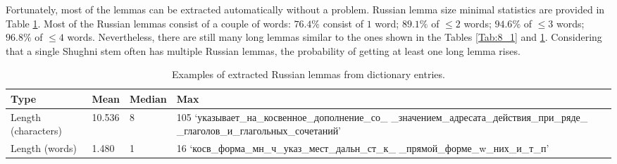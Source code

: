 Fortunately, most of the lemmas can be extracted automatically without a problem. Russian lemma size minimal statistics are provided in Table \ref{Tab:8_2}. Most of the Russian lemmas consist of a couple of words: $76.4\%$ consist of $1$ word; $89.1\%$ of $\leq 2$ words; $94.6\%$ of $\leq 3$ words; $96.8\%$ of $\leq 4$ words. Nevertheless, there are still many long lemmas similar to the ones shown in the Tables \ref{Tab:8_1} and \ref{Tab:8_2}. Considering that a single Shughni stem often has multiple Russian lemmas, the probability of getting at least one long lemma rises.

\begin{table}[!htbp]
    \begin{center}
        \begin{tabular}{|p{3cm}|p{1.5cm}|p{1.5cm}|p{8.5cm}|}
            \hline
            \textbf{Type} & \textbf{Mean} & \textbf{Median} & \textbf{Max} \\
            \hline
            \hline
            Length (characters) & 10.536 & 8 & 105 `указывает\_на\_косвенное\_дополнение\_со\_ \_значением\_адресата\_действия\_при\_ряде\_ \_глаголов\_и\_глагольных\_сочетаний' \\
            \hline
            Length (words) & 1.480 & 1 & 16 `косв\_форма\_мн\_ч\_указ\_мест\_дальн\_ст\_к\_ \_прямой\_форме\_w\_них\_и\_т\_п' \\
            \hline
        \end{tabular}
        \caption{Examples of extracted Russian lemmas from dictionary entries.}
        \label{Tab:8_2}
    \end{center}
\end{table}

\FloatBarrier